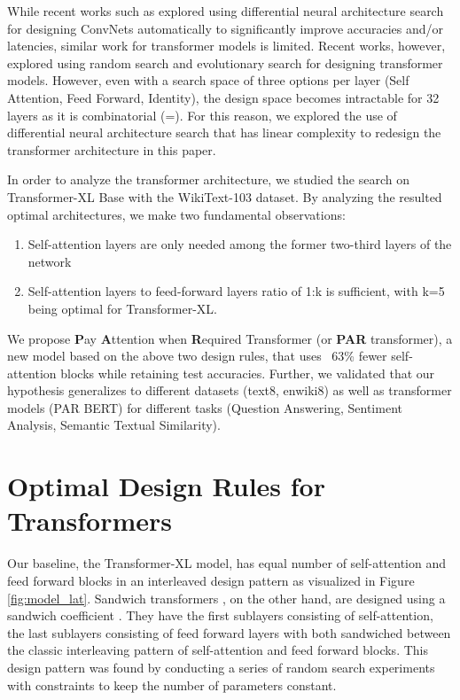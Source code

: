 \documentclass{article}
\begin{document}
While recent works such as \cite{fbnet, fbnet2, darts} explored using differential neural architecture search for designing ConvNets automatically to significantly improve accuracies and/or latencies, similar work for transformer models is limited. Recent works, however, explored using random search \cite{SandwichTransformer} and evolutionary search \cite{hwawaretrans, evolvedtrans} for designing transformer models. However, even with a search space of three options per layer (Self Attention, Feed Forward, Identity), the design space becomes intractable for 32 layers as it is combinatorial (=). For this reason, we explored the use of differential neural architecture search that has linear complexity to redesign the transformer architecture in this paper.

In order to analyze the transformer architecture, we studied the search on Transformer-XL Base with the WikiText-103 dataset. By analyzing the resulted optimal architectures, we make two fundamental observations:

\begin{enumerate}
    \item Self-attention layers are only needed among the former two-third layers of the network
    \item Self-attention layers to feed-forward layers ratio of 1:k is sufficient, with k=5 being optimal for Transformer-XL.
\end{enumerate}

We propose \textbf{P}ay \textbf{A}ttention when \textbf{R}equired Transformer (or \textbf{PAR} transformer), a new model based on the above two design rules, that uses ~63\% fewer self-attention blocks while retaining test accuracies. Further, we validated that our hypothesis generalizes to different datasets (text8, enwiki8) as well as transformer models (PAR BERT) for different tasks (Question Answering, Sentiment Analysis, Semantic Textual Similarity).

\section{Optimal Design Rules for Transformers}

Our baseline, the Transformer-XL model, has equal number of self-attention and feed forward blocks in an interleaved design pattern as visualized in Figure \ref{fig:model_lat}. Sandwich transformers \cite{SandwichTransformer}, on the other hand, are designed using a sandwich coefficient . They have the first  sublayers consisting of self-attention, the last  sublayers consisting of feed forward layers with both sandwiched between the classic interleaving pattern of self-attention and feed forward blocks. This design pattern was found by conducting a series of random search experiments with constraints to keep the number of parameters constant. 
\end{document}
